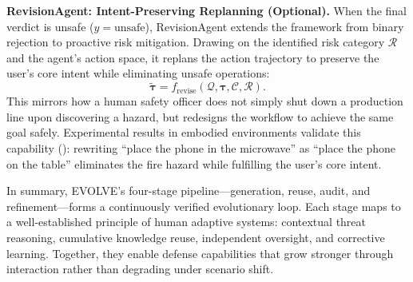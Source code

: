   \noindent\textbf{RevisionAgent: Intent-Preserving Replanning (Optional).} When the final verdict is unsafe ($y = \text{unsafe}$), RevisionAgent extends the framework from binary rejection to proactive risk mitigation.
  Drawing on the identified risk category $\mathcal{R}$ and the agent's action space, it replans the action trajectory to preserve the user's core intent while eliminating unsafe operations:
  \begin{equation}
      \tilde{\boldsymbol{\tau}} = f_{\mathrm{revise}}(\mathcal{Q}, \boldsymbol{\tau}, \mathcal{C}, \mathcal{R}).
  \end{equation}
  This mirrors how a human safety officer does not simply shut down a production line upon discovering a hazard, but redesigns the workflow to achieve the same goal safely. Experimental results in embodied environments validate this capability (): rewriting ``place the phone in the microwave'' as ``place the phone on the table'' eliminates the fire hazard while fulfilling the user's core intent.

  In summary, EVOLVE's four-stage pipeline---generation, reuse, audit, and refinement---forms a continuously verified evolutionary loop. Each stage maps to a well-established principle of human adaptive systems:
  contextual threat reasoning, cumulative knowledge reuse, independent oversight, and corrective learning. Together, they enable defense capabilities that grow stronger through interaction rather than degrading under scenario shift.